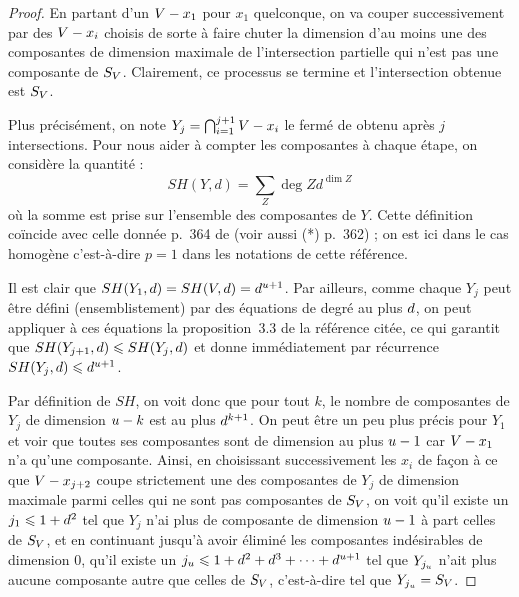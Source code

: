 \begin{proof}
  En partant d'un \( V - x_1 \) pour \( x_1 \) quelconque, on va couper
  successivement par des \( V - x_i \) choisis de sorte à faire chuter la
  dimension d'au moins une des composantes de dimension maximale de
  l'intersection partielle qui n'est pas une composante de \( S_V \).
  Clairement, ce processus se termine et l'intersection obtenue est \( S_V
  \).

  Plus précisément, on note \( Y_j = \bigcap_{i=1}^{j+1} V - x_i \) le
  fermé de  obtenu après \( j \) intersections.  Pour nous aider
  à compter les composantes à chaque étape, on considère la quantité :
  \begin{equation}
    SH(Y, d)
    =
    \sum_Z \deg Z d^{\dim Z}
  \end{equation}
  où la somme est prise sur l'ensemble des composantes de \( Y \). Cette
  définition coïncide avec celle donnée p.~364 de \cite{philz} (voir aussi (*)
  p.~362) ; on est ici dans le cas homogène c'est-à-dire \( p = 1 \) dans les
  notations de cette référence.

  Il est clair que \( SH(Y_1, d) = SH(V, d) = d^{u+1} \).
  Par ailleurs, comme chaque \( Y_j \) peut être défini (ensemblistement) par
  des équations de degré au plus \( d \), on peut appliquer à ces
  équations la proposition~3.3 de la référence citée, ce qui garantit que \(
    SH(Y_{j+1}, d) \leqslant SH(Y_j, d) \) et donne immédiatement par
  récurrence \( SH(Y_j, d) \leqslant d^{u+1} \).

  Par définition de \( SH \), on voit donc que pour tout \( k \), le nombre de
  composantes de \( Y_j \) de dimension \( u - k \) est au plus \(
    d^{k+1} \).  On peut être un peu plus précis pour \( Y_1 \) et voir
  que toutes ses composantes sont de dimension au plus \( u - 1 \) car \(
    V - x_1 \) n'a qu'une composante. Ainsi, en choisissant successivement
  les \( x_i \) de façon à ce que \( V - x_{j+2} \) coupe strictement une
  des composantes de \( Y_j \) de dimension maximale parmi celles qui ne sont
  pas composantes de \( S_V \), on voit qu'il existe un \( j_1 \leqslant 1 +
    d^2 \) tel que \( Y_j \) n'ai plus de composante de dimension \( u
    - 1 \) à part celles de \( S_V \), et en continuant jusqu'à avoir
  éliminé les composantes indésirables de dimension \( 0 \), qu'il existe un
  \( j_u \leqslant 1 + d^2 + d^3 + \dots + d^{u+1} \) tel que \(
    Y_{j_u} \) n'ait plus aucune composante autre que celles de \( S_V
  \), c'est-à-dire tel que \( Y_{j_u} = S_V \).


\end{proof}
